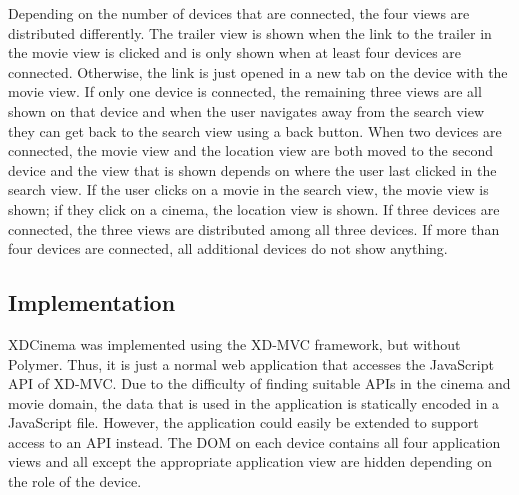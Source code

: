 Depending on the number of devices that are connected, the four views are distributed differently. The trailer view is shown when the link to the trailer in the movie view is clicked and is only shown when at least four devices are connected. Otherwise, the link is just opened in a new tab on the device with the movie view. If only one device is connected, the remaining three views are all shown on that device and when the user navigates away from the search view they can get back to the search view using a back button. When two devices are connected, the movie view and the location view are both moved to the second device and the view that is shown depends on where the user last clicked in the search view. If the user clicks on a movie in the search view, the movie view is shown; if they click on a cinema, the location view is shown. If three devices are connected, the three views are distributed among all three devices. If more than four devices are connected, all additional devices do not show anything.

\subsection{Implementation}

XDCinema was implemented using the XD-MVC framework, but without Polymer. Thus, it is just a normal web application that accesses the JavaScript API of XD-MVC. Due to the difficulty of finding suitable APIs in the cinema and movie domain, the data that is used in the application is statically encoded in a JavaScript file. However, the application could easily be extended to support access to an API instead. The DOM on each device contains all four application views and all except the appropriate application view are hidden depending on the role of the device. 

